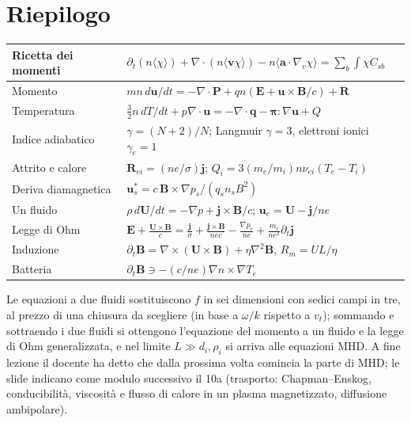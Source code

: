 \section{Riepilogo}
\begin{center}
\small
\begin{tabular}{|l|l|}
\hline
Ricetta dei momenti & $\partial_t(n\langle\chi\rangle)+\nabla\cdot(n\langle\mathbf{v}\chi\rangle)-n\langle\mathbf{a}\cdot\nabla_v\chi\rangle=\sum_b\int\chi C_{sb}$\\
\hline
Momento & $mn\,d\mathbf{u}/dt=-\nabla\cdot\mathbf{P}+qn(\mathbf{E}+\mathbf{u}\times\mathbf{B}/c)+\mathbf{R}$\\
\hline
Temperatura & $\frac32n\,dT/dt+p\nabla\cdot\mathbf{u}=-\nabla\cdot\mathbf{q}-\boldsymbol\pi:\nabla\mathbf{u}+Q$\\
\hline
Indice adiabatico & $\gamma=(N+2)/N$; Langmuir $\gamma=3$, elettroni ionici $\gamma_e=1$\\
\hline
Attrito e calore & $\mathbf{R}_{ei}=(ne/\sigma)\mathbf{j}$; $Q_i=3(m_e/m_i)n\nu_{ei}(T_e-T_i)$\\
\hline
Deriva diamagnetica & $\mathbf{u}^*_s=c\,\mathbf{B}\times\nabla p_s/(q_sn_sB^2)$\\
\hline
Un fluido & $\rho\,d\mathbf{U}/dt=-\nabla p+\mathbf{j}\times\mathbf{B}/c$; $\mathbf{u}_e=\mathbf{U}-\mathbf{j}/ne$\\
\hline
Legge di Ohm & $\mathbf{E}+\frac{\mathbf{U}\times\mathbf{B}}{c}=\frac{\mathbf{j}}{\sigma}+\frac{\mathbf{j}\times\mathbf{B}}{nec}-\frac{\nabla p_e}{ne}+\frac{m_e}{ne^2}\partial_t\mathbf{j}$\\
\hline
Induzione & $\partial_t\mathbf{B}=\nabla\times(\mathbf{U}\times\mathbf{B})+\eta\nabla^2\mathbf{B}$, $R_m=UL/\eta$\\
\hline
Batteria & $\partial_t\mathbf{B}\ni-(c/ne)\nabla n\times\nabla T_e$\\
\hline
\end{tabular}
\end{center}
Le equazioni a due fluidi sostituiscono $f$ in sei dimensioni con sedici campi in tre, al prezzo di una chiusura da scegliere (in base a $\omega/k$ rispetto a $v_t$); sommando e sottraendo i due fluidi si ottengono l'equazione del momento a un fluido e la legge di Ohm generalizzata, e nel limite $L\gg d_i,\rho_i$ si arriva alle equazioni MHD.
A fine lezione il docente ha detto che dalla prossima volta comincia la parte di MHD; le slide indicano come modulo successivo il 10a (trasporto: Chapman--Enskog, conducibilità, viscosità e flusso di calore in un plasma magnetizzato, diffusione ambipolare).
